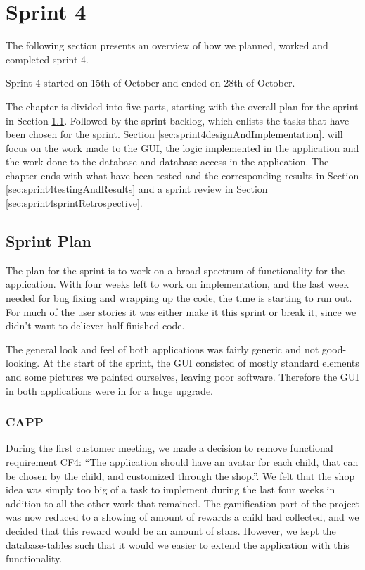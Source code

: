 \chapter{Sprint 4}
\label{chap:sprint4}
The following section presents an overview of how we planned, worked and
completed sprint 4.

Sprint 4 started on 15th of October and ended on 28th of October.

The chapter is divided into five parts, starting with the overall plan for the
sprint in Section \ref{sec:sprint4sprintplan}. Followed by the sprint backlog, which
enlists the tasks that have been chosen for the sprint. Section
\ref{sec:sprint4designAndImplementation}.
will focus on the work made to the GUI, the logic implemented in the application and the work done to the database and database access in the application.
The chapter ends with what have been tested and the corresponding results in
Section \ref{sec:sprint4testingAndResults} and a sprint review in Section
\ref{sec:sprint4sprintRetrospective}.

\section{Sprint Plan}
\label{sec:sprint4sprintplan}
The plan for the sprint is to work on a broad spectrum of functionality for the application. 
With four weeks left to work on implementation, and the last week needed for bug fixing and 
wrapping up the code, the time is starting to run out. For much of the user stories it was either make it this sprint or break it, 
since we didn't want to deliever half-finished code.

The general look and feel of both applications was fairly generic and not good-looking. At the start of the sprint, the GUI consisted of mostly standard elements and some pictures we painted ourselves, leaving poor software. Therefore the GUI in both applications were in for a huge upgrade. 

\subsection{CAPP}
During the first customer meeting, we made a decision to remove functional requirement CF4: ``The application should have an avatar for each child, that can be chosen by the child, and
customized through the shop.''. We felt that the shop idea was simply too big of a task to implement during the last four weeks in addition to all the other work that remained. 
The gamification part of the project was now reduced to a showing of amount of rewards a child had collected, and we decided that this reward would be an amount of stars. 
However, we kept the database-tables such that it would we easier to extend the application with this functionality. 



